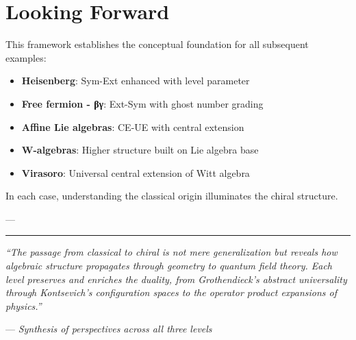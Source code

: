 \section{Looking Forward}

This framework establishes the conceptual foundation for all subsequent examples:

\begin{itemize}
\item \textbf{Heisenberg}: Sym-Ext enhanced with level parameter
\item \textbf{Free fermion - βγ}: Ext-Sym with ghost number grading
\item \textbf{Affine Lie algebras}: CE-UE with central extension
\item \textbf{W-algebras}: Higher structure built on Lie algebra base
\item \textbf{Virasoro}: Universal central extension of Witt algebra
\end{itemize}

In each case, understanding the classical origin illuminates the chiral structure.

---

\begin{center}
\rule{0.5\textwidth}{0.4pt}

\textit{``The passage from classical to chiral is not mere generalization but reveals how algebraic structure propagates through geometry to quantum field theory. Each level preserves and enriches the duality, from Grothendieck's abstract universality through Kontsevich's configuration spaces to the operator product expansions of physics.''}

— \textit{Synthesis of perspectives across all three levels}
\end{center}

